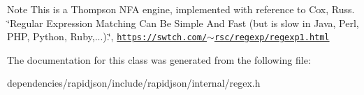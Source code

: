 \begin{DoxyNote}{Note}
This is a Thompson N\+FA engine, implemented with reference to Cox, Russ. \char`\"{}\+Regular Expression Matching Can Be Simple And Fast (but is slow in Java, Perl, P\+H\+P, Python, Ruby,...).\char`\"{}, \href{https://swtch.com/~rsc/regexp/regexp1.html}{\tt https\+://swtch.\+com/$\sim$rsc/regexp/regexp1.\+html} 
\end{DoxyNote}


The documentation for this class was generated from the following file\+:\begin{DoxyCompactItemize}
\item 
dependencies/rapidjson/include/rapidjson/internal/regex.\+h\end{DoxyCompactItemize}

